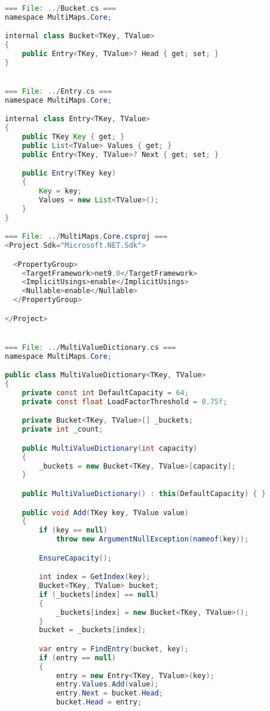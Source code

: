 \documentclass[12pt]{article}
\begin{document}
\begin{lstlisting}[language=Java]

=== File: ../Bucket.cs ===
namespace MultiMaps.Core;

internal class Bucket<TKey, TValue>
{
    public Entry<TKey, TValue>? Head { get; set; }
}


=== File: ../Entry.cs ===
namespace MultiMaps.Core;

internal class Entry<TKey, TValue>
{
    public TKey Key { get; }
    public List<TValue> Values { get; }
    public Entry<TKey, TValue>? Next { get; set; }

    public Entry(TKey key)
    {
        Key = key;
        Values = new List<TValue>();
    }
}

=== File: ../MultiMaps.Core.csproj ===
<Project Sdk="Microsoft.NET.Sdk">

  <PropertyGroup>
    <TargetFramework>net9.0</TargetFramework>
    <ImplicitUsings>enable</ImplicitUsings>
    <Nullable>enable</Nullable>
  </PropertyGroup>

</Project>


=== File: ../MultiValueDictionary.cs ===
namespace MultiMaps.Core;

public class MultiValueDictionary<TKey, TValue>
{
    private const int DefaultCapacity = 64;
    private const float LoadFactorThreshold = 0.75f;

    private Bucket<TKey, TValue>[] _buckets;
    private int _count;

    public MultiValueDictionary(int capacity)
    {
        _buckets = new Bucket<TKey, TValue>[capacity];
    }

    public MultiValueDictionary() : this(DefaultCapacity) { }

    public void Add(TKey key, TValue value)
    {
        if (key == null)
            throw new ArgumentNullException(nameof(key));

        EnsureCapacity();

        int index = GetIndex(key);
        Bucket<TKey, TValue> bucket;
        if (_buckets[index] == null)
        {
            _buckets[index] = new Bucket<TKey, TValue>();
        }
        bucket = _buckets[index];

        var entry = FindEntry(bucket, key);
        if (entry == null)
        {
            entry = new Entry<TKey, TValue>(key);
            entry.Values.Add(value);
            entry.Next = bucket.Head;
            bucket.Head = entry;


\end{lstlisting}
\end{document}
